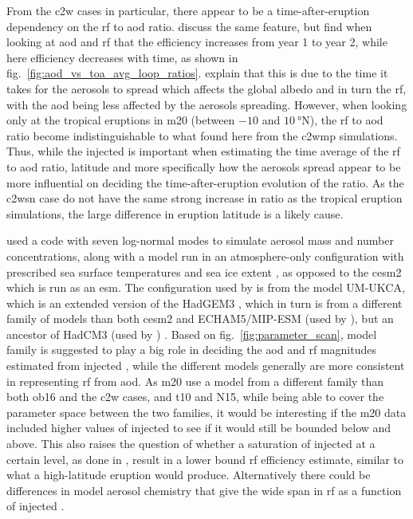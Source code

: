 \documentclass{ametsocV6.1}
\newcommand{\iso}[1][i]{{#1}njected \ce{SO2}}
\begin{document}
From the \gls{c2w} cases in particular, there appear to be a time-after-eruption
dependency on the \gls{rf} to \gls{aod} ratio. \citet{marshall2020} discuss the same
feature, but find when looking at \gls{aod} and \gls{rf} that the efficiency increases
from year 1 to year 2, while here efficiency decreases with time, as shown in
fig.~\ref{fig:aod_vs_toa_avg_loop_ratios}. \citet{marshall2020} explain that this is due
to the time it takes for the aerosols to spread which affects the global albedo and in
turn the \gls{rf}, with the \gls{aod} being less affected by the aerosols spreading.
However, when looking only at the tropical eruptions in \gls{m20} (between \(-10\) and
\(\SI{10}{\degree\mathrm{N}}\)), the \gls{rf} to \gls{aod} ratio become
indistinguishable to what found here from the \gls{c2wmp} simulations. Thus, while the
\iso{} is important when estimating the time average of the \gls{rf} to \gls{aod} ratio,
latitude and more specifically how the aerosols spread appear to be more influential on
deciding the time-after-eruption evolution of the ratio. As the \gls{c2wsn} case do not
have the same strong increase in ratio as the tropical eruption simulations, the large
difference in eruption latitude is a likely cause.

\citet{marshall2019, marshall2020, marshall2021} used a code with seven log-normal modes
to simulate aerosol mass and number concentrations, along with a model run in an
atmosphere-only configuration with prescribed sea surface temperatures and sea ice
extent \citep{marshall2019}, as opposed to the \gls{cesm2} which is run as an \gls{esm}.
The configuration used by \citet{marshall2019} is from the model UM-UKCA, which is an
extended version of the HadGEM3 \citep{dhomse2014}, which in turn is from a different
family of models than both \gls{cesm2} and ECHAM5/MIP-ESM (used by
\citet{timmreck2010,niemeier2015}), but an ancestor of HadCM3 (used by
\citet{gregory2016}) \citep{kuma2023}. Based on fig.~\ref{fig:parameter_scan}, model
family is suggested to play a big role in deciding the \gls{aod} and \gls{rf} magnitudes
estimated from \iso{}, while the different models generally are more consistent in
representing \gls{rf} from \gls{aod}. As \gls{m20} use a model from a different family
than both \gls{ob16} and the \gls{c2w} cases, and \gls{t10} and N15, while being able to
cover the parameter space between the two families, it would be interesting if the
\gls{m20} data included higher values of \iso{} to see if it would still be bounded
below and above. This also raises the question of whether a saturation of \iso{} at a
certain level, as done in \citet{niemeier2015}, result in a lower bound \gls{rf}
efficiency estimate, similar to what a high-latitude eruption would produce.
Alternatively there could be differences in model aerosol chemistry that give the wide
span in \gls{rf} as a function of \iso{}.
\end{document}
